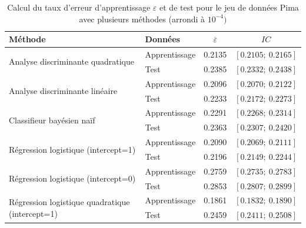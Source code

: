 \documentclass{article}
\begin{document}
\begin{table}[H]
\centering
\caption{Calcul du taux d'erreur d'apprentissage $\varepsilon$ et de test pour le jeu de données Pima avec plusieurs méthodes (arrondi à $10^{-4})$}
\begin{tabular}{l|l|cc}
\multicolumn{1}{l|}{\textbf{Méthode}}    & \textbf{Données} &$ \overline{\varepsilon}$ & $IC$                      \\ \hline
\multirow{2}{*}{Analyse discriminante quadratique} & Apprentissage    & 0.2135                   & $\left[0.2105 ;~ 0.2165 \right]$  \\
                                       & Test             & 0.2385             & $\left[0.2332  ;~ 0.2438 \right]$ \\ \hline
\multirow{2}{*}{Analyse discriminante linéaire}                  & Apprentissage & 0.2096                                 & $\left[0.2070 ;~ 0.2122 \right]$  \\
                                       & Test             & 0.2233                       & $\left[0.2172  ;~ 0.2273 \right]$ \\ \hline
\multirow{2}{*}{Classifieur bayésien naïf}                  & Apprentissage    & 0.2291                             & $\left[0.2268 ;~ 0.2314 \right]$  \\
                                       & Test             & 0.2363                                 & $\left[0.2307 ;~ 0.2420 \right]$ \\ \hline
\multirow{2}{*}{Régression logistique (intercept=1)}                  & Apprentissage    & 0.2090                             & $\left[0.2069 ;~ 0.2111 \right]$  \\
                                       & Test             & 0.2196                                 & $\left[0.2149 ;~ 0.2244 \right]$ \\ \hline
\multirow{2}{*}{Régression logistique (intercept=0)}                  & Apprentissage    & 0.2759                             & $\left[0.2735 ;~ 0.2783 \right]$  \\
                                       & Test             & 0.2853                                 & $\left[0.2807 ;~ 0.2899 \right]$ \\ \hline
\multirow{2}{*}{Régression logistique quadratique (intercept=1)}                  & Apprentissage    & 0.1861                             & $\left[0.1832 ;~ 0.1890 \right]$  \\
                                       & Test             & 0.2459                                 & $\left[0.2411 ;~ 0.2508 \right]$ \\ \hline

\end{tabular}
\end{table}
\end{document}
